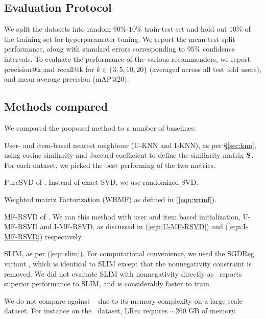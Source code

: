 \subsection{Evaluation Protocol}
We split the datasets into random $90\%$-$10\%$ train-test set and hold out $10\%$ of the training set for hyperparamater tuning. We report the mean test split performance, along with standard errors corresponding to 95\% confidence intervals.
To evaluate the performance of the various recommenders, we report \textsf{precision@k} and \textsf{recall@k} for $k \in \{ 3, 5, 10, 20 \}$ (averaged across all test fold users), and mean average precision (mAP@20).


\subsection{Methods compared}

We compared the proposed method to a number of baselines:
\begin{compactitem}

	\item User- and item-based nearest neighbour (U-KNN and I-KNN), as per \S\ref{sec:knn}, using  cosine similarity and Jaccard coefficient to define the similarity matrix $\mathbf{S}$. For each dataset, we picked the best performing of the two metrics.

	\item PureSVD of \citet{Cremonesi:2010}. Instead of exact SVD, we use randomized SVD.
	
	\item Weighted matrix Factorization (WRMF) as defined in (\ref{eqn:wrmf}).

	\item MF-RSVD of \citet{Tang:2013}.  We ran this method with user and item based initialization, U-MF-RSVD  and I-MF-RSVD, as discussed in (\ref{eqn:U-MF-RSVD}) and (\ref{eqn:I-MF-RSVD}) respectively.
	\item SLIM, as per (\ref{eqn:slim}). For computational convenience, we used the SGDReg variant \citep{Levy:2013}, which is identical to SLIM  except that the nonnegativity constraint is removed. We did not evaluate SLIM with nonnegativity directly as~\citet{Levy:2013} reports superior performance to SLIM, and is considerably faster to train.
\end{compactitem}
We do not compare against ~\citep{Sedhain:2016} due to its memory complexity on a large scale dataset. For instance on the \Lowes \ dataset, LRec requires $\sim$260 GB of memory. 